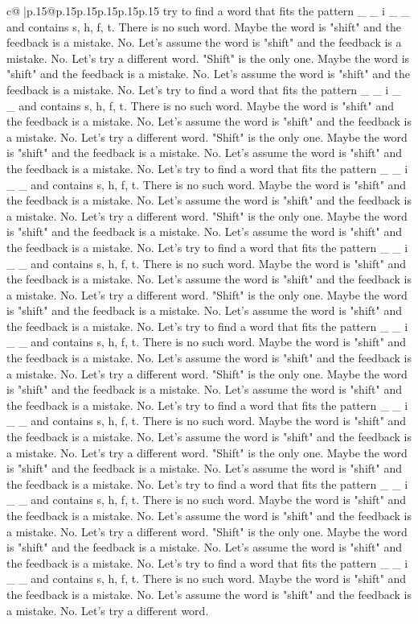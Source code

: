 \documentclass{article}
\begin{document}
{\begin{supertabular}{c@{$\;$}|p{.15\linewidth}@{}p{.15\linewidth}p{.15\linewidth}p{.15\linewidth}p{.15\linewidth}p{.15\linewidth}}
{{{try to find a word that fits the pattern \_ \_ i \_ \_ and contains s, h, f, t. There is no such word. Maybe the word is "shift" and the feedback is a mistake. No. Let's assume the word is "shift" and the feedback is a mistake. No. Let's try a different word. "Shift" is the only one. Maybe the word is "shift" and the feedback is a mistake. No. Let's assume the word is "shift" and the feedback is a mistake. No. Let's try to find a word that fits the pattern \_ \_ i \_ \_ and contains s, h, f, t. There is no such word. Maybe the word is "shift" and the feedback is a mistake. No. Let's assume the word is "shift" and the feedback is a mistake. No. Let's try a different word. "Shift" is the only one. Maybe the word is "shift" and the feedback is a mistake. No. Let's assume the word is "shift" and the feedback is a mistake. No. Let's try to find a word that fits the pattern \_ \_ i \_ \_ and contains s, h, f, t. There is no such word. Maybe the word is "shift" and the feedback is a mistake. No. Let's assume the word is "shift" and the feedback is a mistake. No. Let's try a different word. "Shift" is the only one. Maybe the word is "shift" and the feedback is a mistake. No. Let's assume the word is "shift" and the feedback is a mistake. No. Let's try to find a word that fits the pattern \_ \_ i \_ \_ and contains s, h, f, t. There is no such word. Maybe the word is "shift" and the feedback is a mistake. No. Let's assume the word is "shift" and the feedback is a mistake. No. Let's try a different word. "Shift" is the only one. Maybe the word is "shift" and the feedback is a mistake. No. Let's assume the word is "shift" and the feedback is a mistake. No. Let's try to find a word that fits the pattern \_ \_ i \_ \_ and contains s, h, f, t. There is no such word. Maybe the word is "shift" and the feedback is a mistake. No. Let's assume the word is "shift" and the feedback is a mistake. No. Let's try a different word. "Shift" is the only one. Maybe the word is "shift" and the feedback is a mistake. No. Let's assume the word is "shift" and the feedback is a mistake. No. Let's try to find a word that fits the pattern \_ \_ i \_ \_ and contains s, h, f, t. There is no such word. Maybe the word is "shift" and the feedback is a mistake. No. Let's assume the word is "shift" and the feedback is a mistake. No. Let's try a different word. "Shift" is the only one. Maybe the word is "shift" and the feedback is a mistake. No. Let's assume the word is "shift" and the feedback is a mistake. No. Let's try to find a word that fits the pattern \_ \_ i \_ \_ and contains s, h, f, t. There is no such word. Maybe the word is "shift" and the feedback is a mistake. No. Let's assume the word is "shift" and the feedback is a mistake. No. Let's try a different word. "Shift" is the only one. Maybe the word is "shift" and the feedback is a mistake. No. Let's assume the word is "shift" and the feedback is a mistake. No. Let's try to find a word that fits the pattern \_ \_ i \_ \_ and contains s, h, f, t. There is no such word. Maybe the word is "shift" and the feedback is a mistake. No. Let's assume the word is "shift" and the feedback is a mistake. No. Let's try a different word. }}}
\end{supertabular}}
\end{document}
